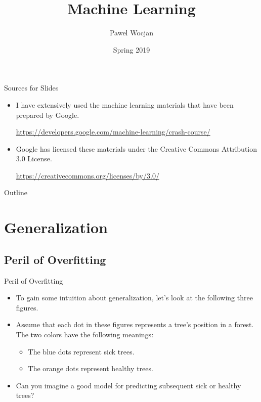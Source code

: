 \documentclass{beamer}
\title[ML]{Machine Learning}
\author{Pawel Wocjan}
\institute{University of Central Florida}
\date{Spring 2019}
\begin{document}
\begin{frame}
  \titlepage
\end{frame}

\begin{frame}{Sources for Slides}

\begin{itemize}
\item I have extensively used the machine learning materials that have been prepared by Google. 

\medskip
\footnotesize{ 
\url{https://developers.google.com/machine-learning/crash-course/}
}

\item Google has licensed these materials under the Creative Commons Attribution 3.0 License.

\medskip
\footnotesize{ 
\url{https://creativecommons.org/licenses/by/3.0/}
}
\end{itemize}
\end{frame}

\begin{frame}{Outline}
  \tableofcontents
\end{frame}

\section{Generalization}

\subsection{Peril of Overfitting}


\begin{frame}{Peril of Overfitting}
\begin{itemize}
    
\item To gain some intuition about generalization, let's look at the following three figures. 

\medskip
\item Assume that each dot in these figures represents a tree's position in a forest. The two colors have the following meanings:
    
\medskip
\begin{itemize}
\item The blue dots represent sick trees.

\medskip
\item The orange dots represent healthy trees.
    
\end{itemize}

\medskip    
\item Can you imagine a good model for predicting subsequent sick or healthy trees? 

\end{itemize}
\end{frame}
\end{document}
